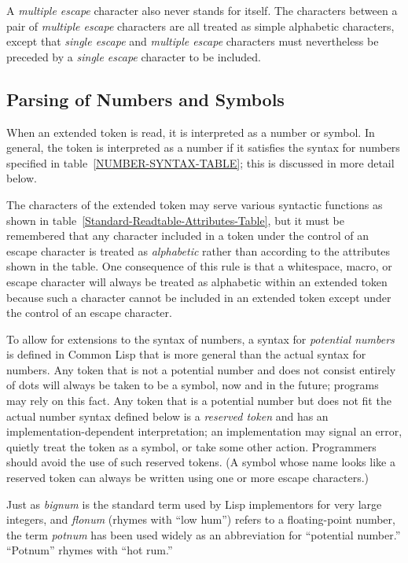 A \emph{multiple escape} character also never stands for itself.  The characters
between a pair of \emph{multiple escape} characters are all treated as
simple alphabetic characters, except that \emph{single escape} and
\emph{multiple escape} characters must nevertheless be preceded by
a \emph{single escape} character to be included.

\subsection{Parsing of Numbers and Symbols}
\label{PARSE-TOKENS-SECTION}

When an extended token is read, it is interpreted as a number or symbol.
In general, the token is interpreted as a number if it satisfies
the syntax for numbers specified in table~\ref{NUMBER-SYNTAX-TABLE};
this is discussed in more detail below.

The characters of the extended token may serve various syntactic
functions as shown
in table~\ref{Standard-Readtable-Attributes-Table}, but it must be
remembered that any character included in a token under the control
of an escape character is treated as \emph{alphabetic} rather than
according to the attributes shown in the table.
One consequence of this rule is that a whitespace, macro, or escape
character will always be treated as alphabetic within an extended token
because such a character cannot be included in an extended
token except under the control of an escape character.

To allow for extensions to the syntax of numbers, a
syntax for \emph{potential numbers} is defined in Common Lisp that is
more general than the actual syntax for numbers.
Any token that is not a potential number and does not consist
entirely of dots will always be taken to be a symbol,
now and in the future; programs may rely on this fact.
Any token that is a potential number but does not fit the
actual number syntax defined below is a \emph{reserved token} and
has an implementation-dependent interpretation;
an implementation may signal an error, quietly treat the token
as a symbol, or take some other action.  Programmers should avoid
the use of such reserved tokens.  (A symbol whose name looks like a reserved
token can always be written using one or more escape characters.)

\begin{new}
Just as \emph{bignum} is the standard term used by Lisp implementors for
very large integers, and \emph{flonum} (rhymes with ``low hum'') refers
to a floating-point number, the term \emph{potnum} has been used widely
as an abbreviation for ``potential number.''  ``Potnum'' rhymes with ``hot rum.''
\end{new}

